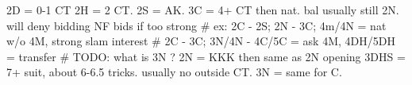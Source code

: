 2D = 0-1 CT
2H = 2 CT. 2S = AK. 3C = 4+ CT
    then nat. bal usually still 2N. will deny bidding NF bids if too strong
    # ex: 2C - 2S; 2N - 3C; 4m/4N = nat w/o 4M, strong slam interest
    # 2C - 3C; 3N/4N - 4C/5C = ask 4M, 4DH/5DH = transfer
    # TODO: what is 3N ?
2N = KKK
    then same as 2N opening
3DHS = 7+ suit, about 6-6.5 tricks. usually no outside CT. 3N = same for C.